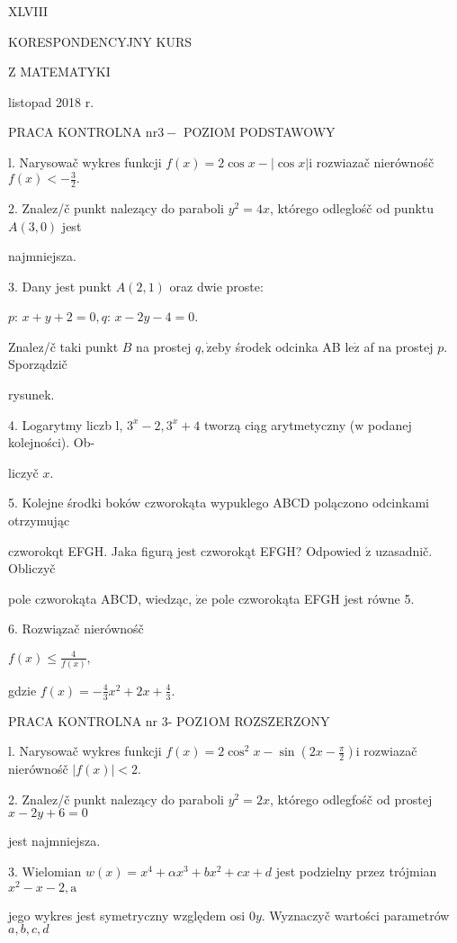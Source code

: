\documentclass[a4paper,12pt]{article}
\begin{document}
XLVIII

KORESPONDENCYJNY KURS

Z MATEMATYKI

listopad 2018 r.

PRACA KONTROLNA $\mathrm{n}\mathrm{r} 3-$ POZIOM PODSTAWOWY

l. Narysowač wykres funkcji $f(x)=2\cos x-|\cos x|\mathrm{i}$ rozwiazač nierównośč $f(x)<-\displaystyle \frac{3}{2}.$

2. Znalez/č punkt nalezący do paraboli $y^{2}=4x$, którego odleglośč od punktu $A(3,0)$ jest

najmniejsza.

3. Dany jest punkt $A(2,1)$ oraz dwie proste:

$p$: $x+y+2=0, q$: $x-2y-4=0.$

Znalez/č taki punkt $B$ na prostej $q, \dot{\mathrm{z}}\mathrm{e}\mathrm{b}\mathrm{y}$ środek odcinka AB $\mathrm{l}\mathrm{e}\dot{\mathrm{z}}$ af $\mathrm{n}\mathrm{a}$ prostej $p$. Sporządzič

rysunek.

4. Logarytmy liczb l, $3^{x}-2, 3^{x}+4$ tworzą ciąg arytmetyczny ($\mathrm{w}$ podanej kolejności). Ob-

liczyč $x.$

5. Kolejne środki boków czworokąta wypuklego ABCD polączono odcinkami otrzymując

czworokqt EFGH. Jaka figurą jest czworokąt EFGH? Odpowied $\acute{\mathrm{z}}$ uzasadnič. Obliczyč

pole czworokąta ABCD, wiedząc, $\dot{\mathrm{z}}\mathrm{e}$ pole czworokąta EFGH jest równe 5.

6. Rozwiązač nierównośč

$f(x)\displaystyle \leq\frac{4}{f(x)},$

gdzie $f(x)=-\displaystyle \frac{4}{3}x^{2}+2x+\frac{4}{3}.$




PRACA KONTROLNA nr 3- POZ1OM ROZSZERZONY

l. Narysowač wykres funkcji $f(x)=2\displaystyle \cos^{2}x-\sin(2x-\frac{\pi}{2})\mathrm{i}$ rozwiazač nierównośč $|f(x)|<2.$

2. Znalez/č punkt nalezący do paraboli $y^{2}=2x$, którego odlegfośč od prostej $x-2y+6=0$

jest najmniejsza.

3. Wielomian $w(x)=x^{4}+\alpha x^{3}+bx^{2}+cx+d$ jest podzielny przez trójmian $x^{2}-x-2, \mathrm{a}$

jego wykres jest symetryczny względem osi $0y$. Wyznaczyč wartości parametrów $a, b, c, d$
\end{document}
